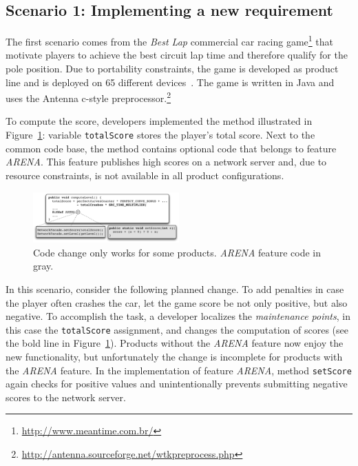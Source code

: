 \subsection{Scenario 1: Implementing a new requirement}
\label{sec:incomplete}

The first scenario comes from the \textit{Best Lap} commercial car racing game\footnote{\url{http://www.meantime.com.br/}} that motivate players to achieve the best circuit lap time and therefore qualify for the pole position. Due to portability constraints, the game is developed as product line and is deployed on 65 different devices~\cite{vander-phd-thesis}. The game is written in Java and uses the Antenna c-style preprocessor.\footnote{\url{http://antenna.sourceforge.net/wtkpreprocess.php}}

To compute the score, developers implemented the method illustrated in Figure~\ref{fig:arena-example}: variable \texttt{totalScore} stores the player's total score. Next to the common code base, the method contains optional code that belongs to feature \emph{ARENA}. This feature publishes high scores on a network server and, due to resource constraints, is not available in all product configurations.

\begin{figure}[h]
    \centering \includegraphics[width=0.5\textwidth]{images/Arena-Example.pdf}
    \caption{Code change only works for some products. \textit{ARENA} feature code in gray.}
    \label{fig:arena-example}
\end{figure}

In this scenario, consider the following planned change.
To add penalties in case the player often crashes the car, let the game score be not only positive, but also negative. To accomplish the task, a developer localizes the \textit{maintenance points}, in this case the \texttt{totalScore} assignment, and changes the computation of scores (see the bold line in Figure~\ref{fig:arena-example}). Products without the \emph{ARENA} feature now enjoy the new functionality, but unfortunately the change is incomplete for products with the \emph{ARENA} feature. In the implementation of feature \emph{ARENA}, method \texttt{setScore} again checks for positive values and unintentionally prevents submitting negative scores to the network server.

